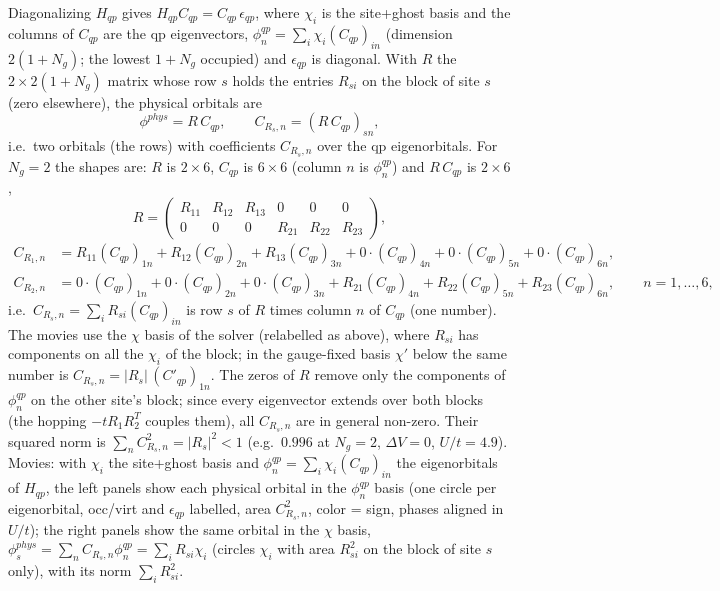 \documentclass[11pt]{article}
\newcommand{\Ng}{N_{g}}
\newcommand{\dV}{\Delta V}
\begin{document}
Diagonalizing $H_{qp}$ gives $H_{qp}C_{qp}=C_{qp}\,\epsilon_{qp}$, where $\chi_i$ is the site+ghost basis and the columns of $C_{qp}$ are the qp eigenvectors, $\phi^{qp}_n=\sum_i\chi_i(C_{qp})_{in}$ (dimension $2(1+\Ng)$; the lowest $1+\Ng$ occupied) and $\epsilon_{qp}$ is diagonal. With $R$ the $2\times2(1+\Ng)$ matrix whose row $s$ holds the entries $R_{si}$ on the block of site $s$ (zero elsewhere), the physical orbitals are
\begin{equation*}
\phi^{phys}=R\,C_{qp},\qquad C_{R_s,n}=(R\,C_{qp})_{sn},
\end{equation*}
i.e.\ two orbitals (the rows) with coefficients $C_{R_s,n}$ over the qp eigenorbitals.
For $\Ng=2$ the shapes are: $R$ is $2\times6$, $C_{qp}$ is $6\times6$ (column $n$ is $\phi^{qp}_n$) and $R\,C_{qp}$ is $2\times6$,
\begin{equation*}
R=\begin{pmatrix} R_{11} & R_{12} & R_{13} & 0 & 0 & 0\\ 0 & 0 & 0 & R_{21} & R_{22} & R_{23}\end{pmatrix},
\end{equation*}
\begin{align*}
C_{R_1,n}&=R_{11}(C_{qp})_{1n}+R_{12}(C_{qp})_{2n}+R_{13}(C_{qp})_{3n}+0\cdot(C_{qp})_{4n}+0\cdot(C_{qp})_{5n}+0\cdot(C_{qp})_{6n},\\
C_{R_2,n}&=0\cdot(C_{qp})_{1n}+0\cdot(C_{qp})_{2n}+0\cdot(C_{qp})_{3n}+R_{21}(C_{qp})_{4n}+R_{22}(C_{qp})_{5n}+R_{23}(C_{qp})_{6n},\qquad n=1,\dots,6,
\end{align*}
i.e.\ $C_{R_s,n}=\sum_iR_{si}(C_{qp})_{in}$ is row $s$ of $R$ times column $n$ of $C_{qp}$ (one number). The movies use the $\chi$ basis of the solver (relabelled as above), where $R_{si}$ has components on all the $\chi_i$ of the block; in the gauge-fixed basis $\chi'$ below the same number is $C_{R_s,n}=|R_s|\,(C'_{qp})_{1n}$. The zeros of $R$ remove only the components of $\phi^{qp}_n$ on the other site's block; since every eigenvector extends over both blocks (the hopping $-tR_1R_2^T$ couples them), all $C_{R_s,n}$ are in general non-zero.
Their squared norm is $\sum_nC_{R_s,n}^2=|R_s|^2<1$ (e.g.\ $0.996$ at $\Ng=2$, $\dV=0$, $U/t=4.9$).
Movies: with $\chi_i$ the site+ghost basis and $\phi^{qp}_n=\sum_i\chi_i(C_{qp})_{in}$ the eigenorbitals of $H_{qp}$, the left panels show each physical orbital in the $\phi^{qp}_n$ basis (one circle per eigenorbital, occ/virt and $\epsilon_{qp}$ labelled, area $C_{R_s,n}^2$, color = sign, phases aligned in $U/t$); the right panels show the same orbital in the $\chi$ basis, $\phi^{phys}_s=\sum_nC_{R_s,n}\phi^{qp}_n=\sum_iR_{si}\chi_i$ (circles $\chi_i$ with area $R_{si}^2$ on the block of site $s$ only), with its norm $\sum_iR_{si}^2$.
\end{document}
